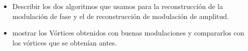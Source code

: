 \begin{itemize}
\item Describir los dos algoritmos que usamos para la reconstrucción
  de la modulación de fase y el de reconstrucción de modulación de
  amplitud. 
\item mostrar los Vórtices obtenidos con buenas modulaciones y
  compararlos con los vórtices que se obtenían antes.
\end{itemize}
\newpage
\pagebreak[4]
